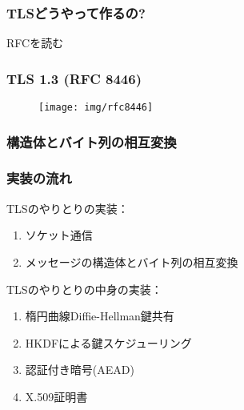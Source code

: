 \documentclass[dvipdfmx, 12pt]{beamer}
\begin{document}
\begin{frame}
  \frametitle{TLSどうやって作るの?}
  \begin{center}
    \Huge
    RFCを読む
  \end{center}
\end{frame}

\begin{frame}
  \frametitle{TLS 1.3 (RFC 8446)}
  \begin{figure}
    \centering
    \texttt{[image: img/rfc8446]}
  \end{figure}
\end{frame}

\begin{frame}[fragile]
  \frametitle{構造体とバイト列の相互変換}

  \footnotesize
  \begin{figure}
    \centering
  \end{figure}
\end{frame}

\begin{frame}
  \frametitle{実装の流れ}

  TLSのやりとりの実装：

  \begin{enumerate}
    \item ソケット通信
    \item メッセージの構造体とバイト列の相互変換
  \end{enumerate}
  \vspace{5mm}

  TLSのやりとりの中身の実装：

  \begin{enumerate}
    \item 楕円曲線Diffie-Hellman鍵共有
    \item HKDFによる鍵スケジューリング
    \item 認証付き暗号(AEAD)
    \item X.509証明書
  \end{enumerate}
\end{frame}

\end{document}
